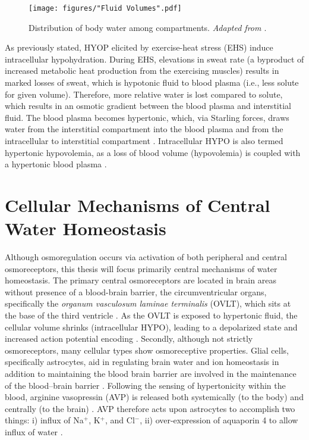 \begin{figure}
	\centering
	\texttt{[image: figures/"Fluid Volumes".pdf]}
	\caption{Distribution of body water among compartments. \textit{Adapted from \cite{sawka_thermoregulatory_1985}}.}
	\label{fig:fluidVolumes}
\end{figure}

As previously stated, HYOP elicited by exercise-heat stress (EHS) induce intracellular hypohydration. During EHS, elevations in sweat rate (a byproduct of increased metabolic heat production from the exercising muscles) \cite{sawka_integrated_2011} results in marked losses of sweat, which is hypotonic fluid to blood plasma (i.e., less solute for given volume). Therefore, more relative water is lost compared to solute, which results in an osmotic gradient between the blood plasma and interstitial fluid. The blood plasma becomes hypertonic, which, via Starling forces, draws water from the interstitial compartment into the blood plasma and from the intracellular to interstitial compartment \cite{cheuvront_dehydration:_2014}. Intracellular HYPO is also termed hypertonic hypovolemia, as a loss of blood volume (hypovolemia) is coupled with a hypertonic blood plasma \cite{darrow_changes_1935}.  

\section{Cellular Mechanisms of Central Water Homeostasis}
Although osmoregulation occurs via activation of both peripheral and central osmoreceptors, this thesis will focus primarily central mechanisms of water homeostasis. The primary central osmoreceptors are located in brain areas without presence of a blood-brain barrier, the circumventricular organs, specifically the \textit{organum vasculosum laminae terminalis} (OVLT), which sits at the base of the third ventricle \cite{bourque_central_2008}. As the OVLT is exposed to hypertonic fluid, the cellular volume shrinks (intracellular HYPO), leading to a depolarized state and increased action potential encoding \cite{bourque_central_2008}. Secondly, although not strictly osmoreceptors, many cellular types show osmoreceptive properties. Glial cells, specifically astrocytes, aid in regulating brain water and ion homeostasis in addition to maintaining the blood brain barrier are involved in the maintenance of the blood–brain barrier \cite{simard_neurobiology_2004}. Following the sensing of hypertonicity within the blood, arginine vasopressin (AVP) is released both systemically (to the body) and centrally (to the brain) \cite{simard_neurobiology_2004}. AVP therefore acts upon astrocytes to accomplish two things: i) influx of Na${^+}$, K${^+}$, and Cl${^-}$, ii) over-expression of aquaporin 4 to allow influx of water \cite{simard_neurobiology_2004}.   

